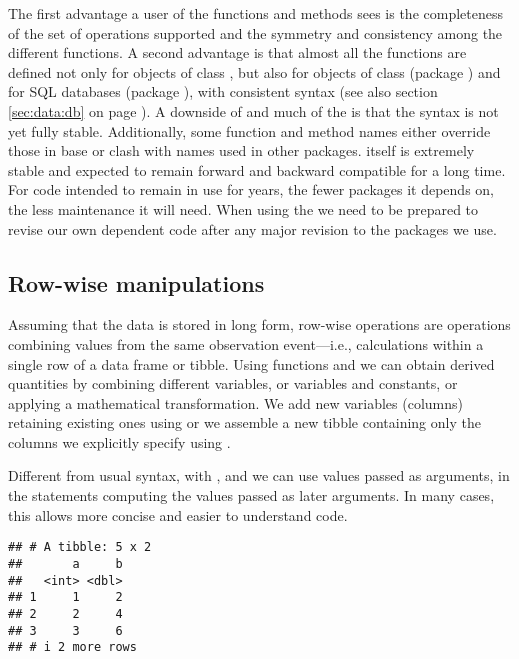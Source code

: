 \documentclass[krantz2]{krantz}\usepackage{knitr}
\begin{document}
The first advantage a user of the  functions and methods sees is the completeness of the set of operations supported and the symmetry and consistency among the different functions. A second advantage is that almost all the functions are defined not only for objects of class , but also for objects of class  (package ) and for SQL databases (package ), with consistent syntax (see also section \ref{sec:data:db} on page \pageref{sec:data:db}). A downside of  and much of the  is that the syntax is not yet fully stable. Additionally, some function and method names either override those in base \Rlang or clash with names used in other packages. \Rlang itself is extremely stable and expected to remain forward and backward compatible for a long time. For code intended to remain in use for years, the fewer packages it depends on, the less maintenance it will need. When using the  we need to be prepared to revise our own dependent code after any major revision to the  packages we use.

\subsection{Row-wise manipulations}

Assuming that the data is stored in long form, row-wise operations are operations combining values from the same observation event---i.e., calculations within a single row of a data frame or tibble. Using functions  and  we can obtain derived quantities by combining different variables, or variables and constants, or applying a mathematical transformation. We add new variables (columns) retaining existing ones using  or we assemble a new tibble containing only the columns we explicitly specify using .

\begin{explainbox}
Different from usual \Rlang syntax, with ,  and  we can use values passed as arguments, in the statements computing the values passed as later arguments. In many cases, this allows more concise and easier to understand code.

\begin{knitrout}\footnotesize
{}\color{fgcolor}\begin{kframe}
\begin{alltt}
\hlstd{(} \hlstd{=} \hlopt{:}\hlstd{,}  \hlstd{=}  \hlopt{*} 
\end{alltt}
\begin{verbatim}
## # A tibble: 5 x 2
##       a     b
##   <int> <dbl>
## 1     1     2
## 2     2     4
## 3     3     6
## # i 2 more rows
\end{verbatim}
\end{kframe}
\end{knitrout}
\end{explainbox}
\end{document}
